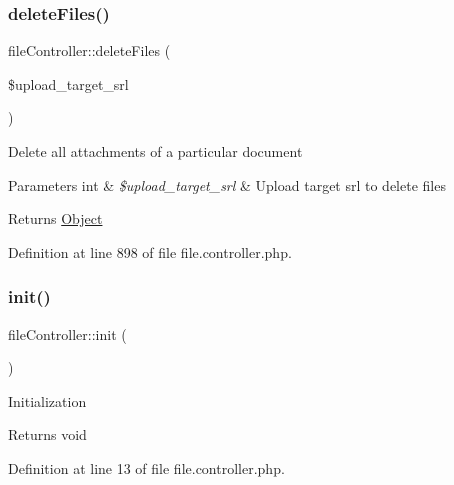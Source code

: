 \mbox{\label{classfileController_ae3060e078930eeaae0c939d7a1c4f229}} 
\subsubsection{\texorpdfstring{delete\+Files()}{deleteFiles()}}
{\footnotesize\ttfamily file\+Controller\+::delete\+Files (\begin{DoxyParamCaption}\item[{}]{\$upload\+\_\+target\+\_\+srl }\end{DoxyParamCaption})}

Delete all attachments of a particular document


\begin{DoxyParams}[1]{Parameters}
int & {\em \$upload\+\_\+target\+\_\+srl} & Upload target srl to delete files \\
\hline
\end{DoxyParams}
\begin{DoxyReturn}{Returns}
\hyperlink{classObject}{Object} 
\end{DoxyReturn}


Definition at line 898 of file file.\+controller.\+php.

\mbox{\label{classfileController_aea1086732740ff005a00f7152e30937d}} 
\subsubsection{\texorpdfstring{init()}{init()}}
{\footnotesize\ttfamily file\+Controller\+::init (\begin{DoxyParamCaption}{ }\end{DoxyParamCaption})}

Initialization \begin{DoxyReturn}{Returns}
void 
\end{DoxyReturn}


Definition at line 13 of file file.\+controller.\+php.

\mbox{\label{classfileController_aa9247b382342e097dcd71dac7b944c50}} 
